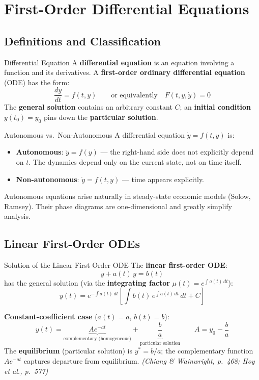 \documentclass[12pt, a4paper]{article}
\theoremstyle{definition}
\newcommand{\dd}[1]{\,d#1}
\newcommand{\ddd}[2]{\dfrac{d#1}{d#2}}
\begin{document}
\section{First-Order Differential Equations}

\subsection{Definitions and Classification}

\begin{defbox}{Differential Equation}
A \textbf{differential equation} is an equation involving a function and
its derivatives. A \textbf{first-order ordinary differential equation} (ODE)
has the form:
\[
  \ddd{y}{t} = f(t, y) \qquad \text{or equivalently} \quad
  F(t, y, \dot y) = 0
\]
The \textbf{general solution} contains an arbitrary constant $C$; an
\textbf{initial condition} $y(t_0)=y_0$ pins down the \textbf{particular
solution}.
\end{defbox}

\begin{defbox}{Autonomous vs.\ Non-Autonomous}
A differential equation $\dot y = f(t,y)$ is:
\begin{itemize}
  \item \textbf{Autonomous}: $\dot y = f(y)$ --- the right-hand side does not
        explicitly depend on $t$. The dynamics depend only on the current
        state, not on time itself.
  \item \textbf{Non-autonomous}: $\dot y = f(t,y)$ --- time appears explicitly.
\end{itemize}
Autonomous equations arise naturally in steady-state economic models (Solow,
Ramsey). Their phase diagrams are one-dimensional and greatly simplify
analysis.
\end{defbox}

\subsection{Linear First-Order ODEs}

\begin{thmbox}{Solution of the Linear First-Order ODE}
The \textbf{linear first-order ODE}:
\[
  \dot y + a(t)\,y = b(t)
\]
has the general solution (via the \textbf{integrating factor}
$\mu(t) = e^{\int a(t)\dd{t}}$):
\[
  y(t) = e^{-\int a(t)\dd{t}}\!\left[\int b(t)\,e^{\int a(t)\dd{t}}\dd{t} + C\right]
\]

\textbf{Constant-coefficient case} ($a(t)=a$, $b(t)=b$):
\[
  \boxed{y(t) = \underbrace{Ae^{-at}}_{\text{complementary (homogeneous)}}
               + \underbrace{\frac{b}{a}}_{\text{particular solution}}}
  \qquad A = y_0 - \frac{b}{a}
\]
The \textbf{equilibrium} (particular solution) is $y^* = b/a$; the
complementary function $Ae^{-at}$ captures departure from equilibrium.
\emph{(Chiang \& Wainwright, p.\ 468; Hoy et al., p.\ 577)}
\end{thmbox}
\end{document}
